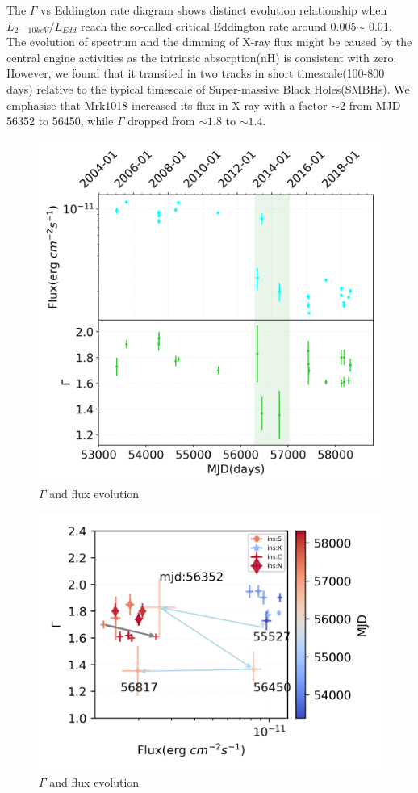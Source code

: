 \documentclass{aastex63}
\begin{document}
The $\Gamma$ vs Eddington rate diagram shows distinct evolution relationship when $L_{2-10 keV}/L_{Edd}$ reach the so-called critical Eddington rate around 0.005$\sim$ 0.01. The evolution of spectrum and the dimming of X-ray flux might be caused by the central engine activities as the intrinsic absorption(nH) is consistent with zero. However, we found that it transited in two tracks in short timescale(100-800 days) relative to the typical timescale of Super-massive Black Holes(SMBHs). We emphasise that Mrk1018 increased its flux in X-ray with a factor $\sim2$ from MJD 56352 to 56450, while $\Gamma$ dropped from $\sim1.8$ to $\sim1.4$.  


\begin{figure}
\centering
	\includegraphics[width=0.6\columnwidth]{./pic/subplots-xrayappendgood-fandg-second.png}
    \caption{$\Gamma$ and flux evolution}
    \label{fig:xrayappendgood-fandg-secondaxis}
\end{figure}

\begin{figure}
\centering
	\includegraphics[width=0.7\columnwidth]{./pic/xrayappendgood-errorbar-f-g-tmap.png}
    \caption{$\Gamma$ and flux evolution}
    \label{fig:xrayappendgood-fandg-tmap}
\end{figure}
\end{document}
